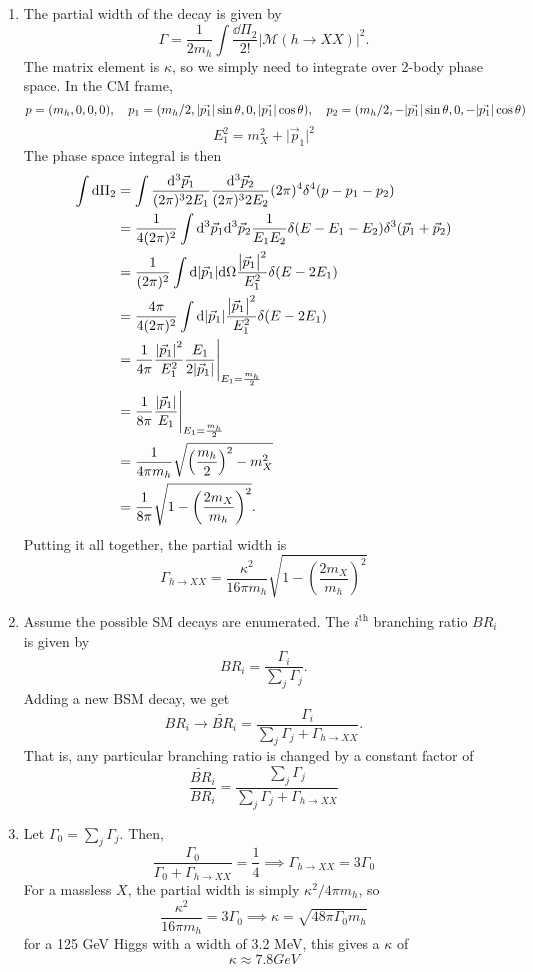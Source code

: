 \documentclass[12pt]{article}
\newcommand{\magsq}[1]{\big|#1\big|^2}
\begin{document}
\begin{enumerate}[label=(\roman*)]
    \item The partial width of the decay is given by
    \[ \Gamma = \frac{1}{2m_h}\int \frac{\dd\Pi_2}{2!} \magsq{\mathcal{M}(h\to XX)}. \]
    The matrix element is $\kappa$, so we simply need to integrate over 2-body phase space. In the CM frame, 
    \[ p = (m_h, 0, 0, 0), \quad p_1 = (m_h/2, \abs{\vec{p_1}}\sin\theta, 0, \abs{\vec{p_1}}\cos\theta), \quad p_2 = (m_h/2, -\abs{\vec{p_1}}\sin\theta, 0, -\abs{\vec{p_1}}\cos\theta) \]
    \[ E_1^2 = m_X^2 + \magsq{\vec{p}_1} \]
    The phase space integral is then
    \begin{align*}
        \int\dd\Pi_2 &= \int \frac{\dd^3\vec{p}_1}{(2\pi)^32E_1}\frac{\dd^3\vec{p}_2}{(2\pi)^32E_2}(2\pi)^4\delta^4(p - p_1 - p_2) \\
        &= \frac{1}{4(2\pi)^2}\int\dd^3\vec{p}_1\dd^3\vec{p}_2\frac{1}{E_1E_2}\delta(E-E_1-E_2)\delta^3(\vec{p}_1+\vec{p}_2) \\
        &= \frac{1}{(2\pi)^2}\int\dd\abs{\vec{p}_1}\dd\Omega\frac{\magsq{\vec{p}_1}}{E_1^2}\delta(E-2E_1) \\
        &= \frac{4\pi}{4(2\pi)^2}\int\dd\abs{\vec{p}_1}\frac{\magsq{\vec{p}_1}}{E_1^2}\delta(E-2E_1) \\
        &= \frac{1}{4\pi}\frac{\abs{\vec{p}_1}^2}{E_1^2}\frac{E_1}{2\abs{\vec{p}_1}}\Biggr\rvert_{E_1=\frac{m_h}{2}} \\
        &= \frac{1}{8\pi}\frac{\abs{\vec{p}_1}}{E_1}\Biggr\rvert_{E_1=\frac{m_h}{2}} \\
        &= \frac{1}{4\pi m_h}\sqrt{\left(\frac{m_h}{2}\right)^2 - m_X^2} \\
        &= \frac{1}{8\pi}\sqrt{1 - \left(\frac{2m_X}{m_h}\right)^2}.
    \end{align*}
    Putting it all together, the partial width is
    \[ \Gamma_{h\to XX} = \frac{\kappa^2}{16\pi m_h}\sqrt{1 - \left(\frac{2m_X}{m_h}\right)^2} \]

    \item Assume the possible SM decays are enumerated. The $i^\text{th}$ branching ratio $BR_i$ is given by
    \[ BR_i = \frac{\Gamma_i}{\sum_j\Gamma_j}. \]
    Adding a new BSM decay, we get
    \[ BR_i \to \tilde{BR}_i = \frac{\Gamma_i}{\sum_j\Gamma_j + \Gamma_{h\to XX}}. \]
    That is, any particular branching ratio is changed by a constant factor of
    \[ \frac{\tilde{BR}_i}{BR_i} = \frac{\sum_j\Gamma_j}{\sum_j\Gamma_j + \Gamma_{h\to XX}} \]

    \item Let $\Gamma_0 = \sum_j\Gamma_j$. Then,
    \[ \frac{\Gamma_0}{\Gamma_0 + \Gamma_{h\to XX}} = \frac{1}{4} \implies \Gamma_{h\to XX} = 3\Gamma_0 \]
    For a massless $X$, the partial width is simply $\kappa^2/4\pi m_h$, so
    \[ \frac{\kappa^2}{16\pi m_h} = 3\Gamma_0 \implies \kappa = \sqrt{48\pi\Gamma_0m_h} \]
    for a 125 GeV Higgs with a width of 3.2 MeV, this gives a $\kappa$ of
    \[ \kappa \approx 7.8 GeV \]
\end{enumerate}
\end{document}
